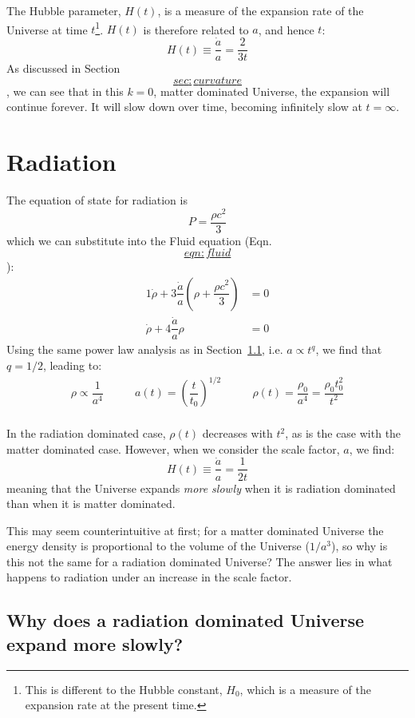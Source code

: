 \documentclass[]{book}
\let\rmarkdownfootnote\footnote%
\def\footnote{\protect\rmarkdownfootnote}
\begin{document}
The Hubble parameter, \(H(t)\), is a measure of the expansion rate of the
Universe at time \(t\)\footnote{This is different to the Hubble constant, \(H_0\), which is a measure of
  the expansion rate at the present time.}. \(H(t)\) is therefore related to \(a\), and hence
\(t\): \[H(t) \equiv \dfrac{\dot{a}}{a} = \dfrac{2}{3t}\] As discussed in
Section~\protect\hyperlink{sec:curvature}{\[sec:curvature\]}, we can see that in this \(k=0\), matter
dominated Universe, the expansion will continue forever. It will slow
down over time, becoming infinitely slow at \(t=\infty\).

\hypertarget{sec:radiation_eos}{%
\section{Radiation}\label{sec:radiation_eos}}

The equation of state for radiation is \[P = \dfrac{\rho c^2}{3}\] which
we can substitute into the Fluid equation
(Eqn.~\protect\hyperlink{eqn:fluid}{\[eqn:fluid\]}): \[\begin{aligned}
{1}
    \dot{\rho} + 3\dfrac{\dot{a}}{a}\left(\rho + \dfrac{\rho c^2}{3}\right) &= 0\\
    \dot{\rho} + 4\dfrac{\dot{a}}{a}\rho &= 0\end{aligned}\] Using the
same power law analysis as in
Section~\protect\hyperlink{sec:matter_eos}{1.1}, i.e. \(a \propto t^q\), we find that
\(q = 1/2\), leading to: \[\begin{array}{lcr}
    \rho \propto \dfrac{1}{a^4} & \qquad a(t) = \left(\dfrac{t}{t_0}\right)^{1/2} & \qquad \rho(t) = \dfrac{\rho_0}{a^4} = \dfrac{\rho_0 t_0^2}{t^2}\\
    \end{array}\]

In the radiation dominated case, \(\rho(t)\) decreases with \(t^2\), as is
the case with the matter dominated case. However, when we consider the
scale factor, \(a\), we find:
\[H(t) \equiv \dfrac{\dot{a}}{a} = \dfrac{1}{2t}\] meaning that the
Universe expands \emph{more slowly} when it is radiation dominated than when
it is matter dominated.

This may seem counterintuitive at first; for a matter dominated Universe
the energy density is proportional to the volume of the Universe
(\(1/a^3\)), so why is this not the same for a radiation dominated
Universe? The answer lies in what happens to radiation under an increase
in the scale factor.

\hypertarget{sec:slow_expansion_rad}{%
\subsection{Why does a radiation dominated Universe expand more slowly?}\label{sec:slow_expansion_rad}}
\end{document}
